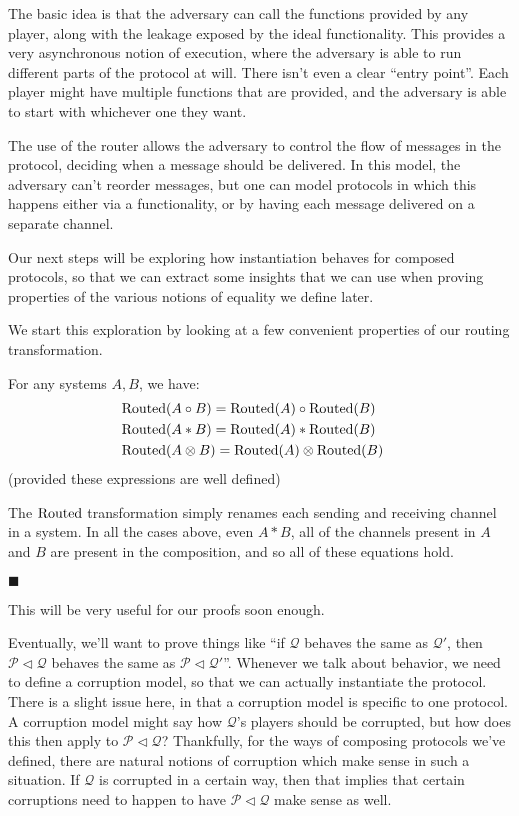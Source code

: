The basic idea is that the adversary can call the functions
provided by any player, along with the leakage exposed
by the ideal functionality.
This provides a very asynchronous notion of execution,
where the adversary is able to run different parts of the protocol
at will.
There isn't even a clear ``entry point''.
Each player might have multiple functions that are provided,
and the adversary is able to start with whichever one they want.

The use of the router allows the adversary to control the flow
of messages in the protocol, deciding when a message should be delivered.
In this model, the adversary can't reorder messages, but one can
model protocols in which this happens either via a functionality,
or by having each message delivered on a separate channel.

Our next steps will be exploring how instantiation behaves
for composed protocols, so that we can extract some insights
that we can use when proving properties of the various
notions of equality we define later.

We start this exploration by looking at a few convenient properties
of our routing transformation.

\begin{lemma}
  \label{thm:routed}
  For any systems $A, B$, we have:
$$
\begin{aligned}
  &\text{Routed}(A \circ B) = \text{Routed}(A) \circ \text{Routed}(B)\cr
  &\text{Routed}(A * B) = \text{Routed}(A) * \text{Routed}(B)\cr
  &\text{Routed}(A \otimes B) = \text{Routed}(A) \otimes \text{Routed}(B)\cr
\end{aligned}
$$
(provided these expressions are well defined)

 The $\text{Routed}$ transformation simply
renames each sending and receiving channel in a system.
In all the cases above, even $A * B$, all of the channels present
in $A$ and $B$ are present in the composition, and so all
of these equations hold.

$\blacksquare$
\end{lemma}

This will be very useful for our proofs soon enough.

Eventually, we'll want to prove things like ``if $\mathscr{Q}$
behaves the same as $\mathscr{Q}'$, then $\mathscr{P} \lhd \mathscr{Q}$
behaves the same as $\mathscr{P} \lhd \mathscr{Q}'$''.
Whenever we talk about behavior, we need to define a corruption model,
so that we can actually instantiate the protocol.
There is a slight issue here, in that a corruption
model is specific to one protocol.
A corruption model might say how $\mathscr{Q}$'s players should be
corrupted, but how does this then apply to
$\mathscr{P} \lhd \mathscr{Q}$?
Thankfully, for the ways of composing protocols we've defined,
there are natural notions of corruption which make sense in such
a situation.
If $\mathscr{Q}$ is corrupted in a certain way, then that
implies that certain corruptions need to happen
to have $\mathscr{P} \lhd \mathscr{Q}$ make sense as well.

